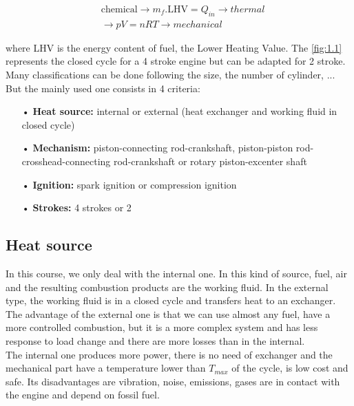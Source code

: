 	\begin{equation}
	\begin{aligned}
	&\mbox{chemical} \rightarrow m_f. \mbox{LHV} = Q_{in} \rightarrow thermal\\
	 &\rightarrow pV = nRT \rightarrow mechanical
	\end{aligned}	
	\end{equation}
	
	where LHV is the energy content of fuel, the Lower Heating Value. The \autoref{fig:1.1} represents the closed cycle for a 4 stroke engine but can be adapted for 2 stroke. \\
	
	Many classifications can be done following the size, the number of cylinder, ... But the mainly used one consists in 4 criteria:\\
	
	\begin{itemize}
		\item[•] \textbf{Heat source:} internal  or external (heat exchanger and working fluid in closed cycle)
		\item[•] \textbf{Mechanism:} piston-connecting rod-crankshaft, piston-piston rod-crosshead-connecting rod-crankshaft or rotary piston-excenter shaft
		\item[•] \textbf{Ignition:} spark ignition or compression ignition
		\item[•] \textbf{Strokes:} 4 strokes or 2
	\end{itemize}	 
	
	\subsection{Heat source}
		In this course, we only deal with the internal one. In this kind of source, fuel, air and the resulting combustion products are the working fluid. In the external type, the working fluid is in a closed cycle and transfers heat to an exchanger. The advantage of the external one is that we can use almost any fuel, have a more controlled combustion, but it is a more complex system and has less response to load change and there are more losses than in the internal.   \\
		
		The internal one produces more power, there is no need of exchanger and the mechanical part have a temperature lower than $T_{max}$ of the cycle, is low cost and safe. Its disadvantages are vibration, noise, emissions, gases are in contact with the engine and depend on fossil fuel. 
		
